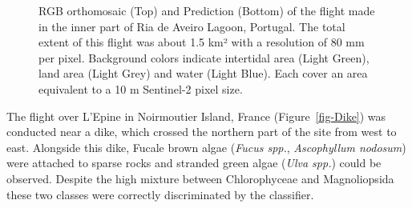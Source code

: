 \documentclass[
  number]{elsarticle}
\begin{document}
\label{cell-fig-Boat}
\begin{figure}[H]


\caption{\label{fig-Boat}RGB orthomosaic (Top) and Prediction (Bottom)
of the flight made in the inner part of Ria de Aveiro Lagoon, Portugal.
The total extent of this flight was about 1.5 km² with a resolution of
80 mm per pixel. Background colors indicate intertidal area (Light
Green), land area (Light Grey) and water (Light Blue). Each cover an
area equivalent to a 10 m Sentinel-2 pixel size.}

\end{figure}%

The flight over L'Epine in Noirmoutier Island, France
(Figure~\ref{fig-Dike}) was conducted near a dike, which crossed the
northern part of the site from west to east. Alongside this dike, Fucale
brown algae (\emph{Fucus spp.}, \emph{Ascophyllum nodosum}) were
attached to sparse rocks and stranded green algae (\emph{Ulva spp.})
could be observed. Despite the high mixture between Chlorophyceae and
Magnoliopsida these two classes were correctly discriminated by the
classifier.
\end{document}
